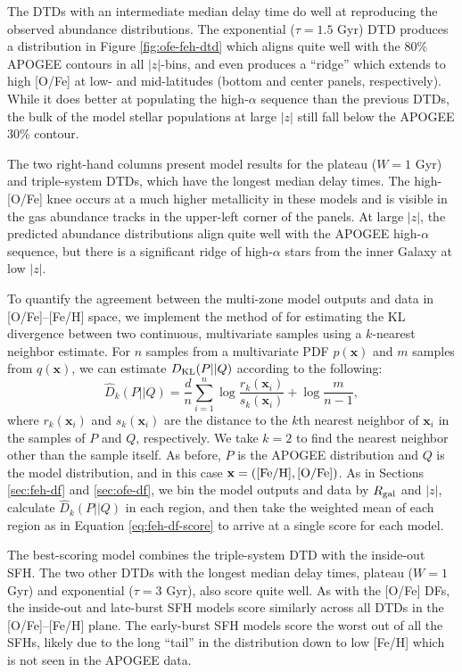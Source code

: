 \documentclass[twocolumn,twocolappendix,linenumbers]{aastex631}
\begin{document}
The DTDs with an intermediate median delay time do well at reproducing the observed abundance distributions. The exponential ($\tau=1.5$ Gyr) DTD produces a distribution in Figure \ref{fig:ofe-feh-dtd} which aligns quite well with the 80\% APOGEE contours in all $|z|$-bins, and even produces a ``ridge'' which extends to high [O/Fe] at low- and mid-latitudes (bottom and center panels, respectively). While it does better at populating the high-$\alpha$ sequence than the previous DTDs, the bulk of the model stellar populations at large $|z|$ still fall below the APOGEE 30\% contour. 

The two right-hand columns present model results for the plateau ($W=1$ Gyr) and triple-system DTDs, which have the longest median delay times. The high-[O/Fe] knee occurs at a much higher metallicity in these models and is visible in the gas abundance tracks in the upper-left corner of the panels. At large $|z|$, the predicted abundance distributions align quite well with the APOGEE high-$\alpha$ sequence, but there is a significant ridge of high-$\alpha$ stars from the inner Galaxy at low $|z|$.

To quantify the agreement between the multi-zone model outputs and data in [O/Fe]--[Fe/H] space, we implement the method of \citet{PerezCruz2008-KLTest2D} for estimating the KL divergence between two continuous, multivariate samples using a $k$-nearest neighbor estimate. For $n$ samples from a multivariate PDF $p(\mathbf{x})$ and $m$ samples from $q(\mathbf{x})$, we can estimate $D_{\rm KL}(P||Q)$ according to the following:
\begin{equation}
    \hat D_k(P||Q) = \frac dn \sum_{i=1}^n\log\frac{r_k(\mathbf{x}_i)}{s_k(\mathbf{x}_i)} + \log\frac{m}{n-1},
\end{equation}
where $r_k(\mathbf{x}_i)$ and $s_k(\mathbf{x}_i)$ are the distance to the $k$th nearest neighbor of $\mathbf{x}_i$ in the samples of $P$ and $Q$, respectively. We take $k=2$ to find the nearest neighbor other than the sample itself. As before, $P$ is the APOGEE distribution and $Q$ is the model distribution, and in this case $\mathbf{x}=({\rm [Fe/H]}, {\rm [O/Fe]})$.
As in Sections \ref{sec:feh-df} and \ref{sec:ofe-df}, we bin the model outputs and data by $R_{\rm gal}$ and $|z|$, calculate $\hat D_k(P||Q)$ in each region, and then take the weighted mean of each region as in Equation \ref{eq:feh-df-score} to arrive at a single score for each model.

The best-scoring model combines the triple-system DTD with the inside-out SFH. The two other DTDs with the longest median delay times, plateau ($W=1$ Gyr) and exponential ($\tau=3$ Gyr), also score quite well. As with the [O/Fe] DFs, the inside-out and late-burst SFH models score similarly across all DTDs in the [O/Fe]--[Fe/H] plane. The early-burst SFH models score the worst out of all the SFHs, likely due to the long ``tail'' in the distribution down to low [Fe/H] which is not seen in the APOGEE data.
\end{document}
